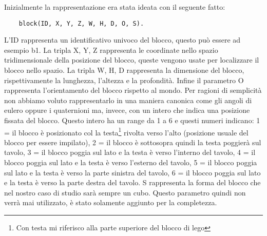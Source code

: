 Inizialmente la rappresentazione era stata ideata con il seguente fatto:
\begin{verbatim}
    block(ID, X, Y, Z, W, H, D, O, S).
\end{verbatim}
L'ID rappresenta un identificativo univoco del blocco, questo può essere ad esempio b1. La tripla X, Y, Z rappresenta le coordinate nello spazio tridimensionale della posizione del blocco, queste vengono usate per localizzare il blocco nello spazio. La tripla W, H, D rappresenta la dimensione del blocco, rispettivamente la lunghezza, l'altezza e la profondità. Infine il parametro O
rappresenta l'orientamento del blocco rispetto al mondo. Per ragioni di semplicità non abbiamo voluto rappresentarlo in una maniera canonica come gli angoli di eulero oppure i quaternioni ma, invece, con un intero che indica una posizione fissata del blocco. Questo intero ha un range da 1 a 6 e questi numeri indicano: 1 = il blocco è posizionato col la testa\footnote{Con testa mi riferisco alla parte superiore del blocco di lego} rivolta verso l'alto (posizione usuale del blocco per essere impilato), 2 = il blocco è sottosopra quindi la testa poggierà sul tavolo, 3 = il blocco poggia sul lato e la testa è verso l'interno del tavolo, 4 = il blocco poggia sul lato e la testa è verso l'esterno del tavolo, 5 = il blocco poggia sul lato e la testa è verso la parte sinistra del tavolo, 6 = il blocco poggia sul lato e la testa è verso la parte destra del tavolo.
S rappresenta la forma del blocco che nel nostro caso di studio sarà sempre un cubo. Questo parametro quindi non verrà mai utilizzato, è stato solamente aggiunto per la completezza.

